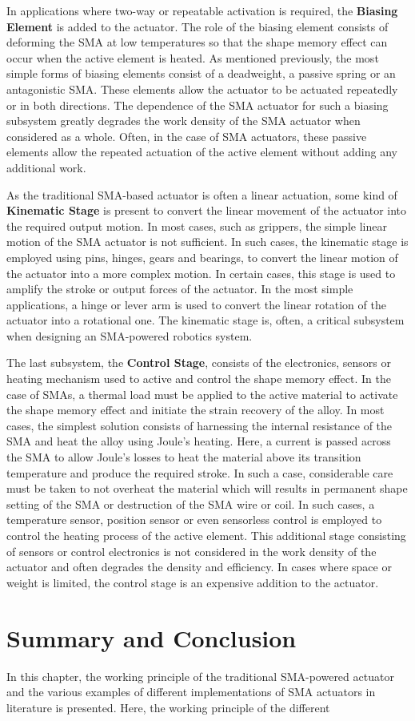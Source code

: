 In applications where two-way or repeatable activation is required, the \textbf{Biasing Element} is added to the actuator. The role of the biasing element consists of deforming the SMA at low temperatures so that the shape memory effect can occur when the active element is heated. As mentioned previously, the most simple forms of biasing elements consist of a deadweight, a passive spring or an antagonistic SMA. These elements allow the actuator to be actuated repeatedly or in both directions. The dependence of the SMA actuator for such a biasing subsystem greatly degrades the work density of the SMA actuator when considered as a whole. Often, in the case of SMA actuators, these passive elements allow the repeated actuation of the active element without adding any additional work.

As the traditional SMA-based actuator is often a linear actuation, some kind of \textbf{Kinematic Stage} is present to convert the linear movement of the actuator into the required output motion. In most cases, such as grippers, the simple linear motion of the SMA actuator is not sufficient. In such cases, the kinematic stage is employed using pins, hinges, gears and bearings, to convert the linear motion of the actuator into a more complex motion. In certain cases, this stage is used to amplify the stroke or output forces of the actuator. In the most simple applications, a hinge or lever arm is used to convert the linear rotation of the actuator into a rotational one. The kinematic stage is, often, a critical subsystem when designing an SMA-powered robotics system.

The last subsystem, the \textbf{Control Stage}, consists of the electronics, sensors or heating mechanism used to active and control the shape memory effect. In the case of SMAs, a thermal load must be applied to the active material to activate the shape memory effect and initiate the strain recovery of the alloy. In most cases, the simplest solution consists of harnessing the internal resistance of the SMA and heat the alloy using Joule's heating. Here, a current is passed across the SMA to allow Joule's losses to heat the material above its transition temperature and produce the required stroke. In such a case, considerable care must be taken to not overheat the material which will results in permanent shape setting of the SMA or destruction of the SMA wire or coil. In such cases, a temperature sensor, position sensor or even sensorless control is employed to control the heating process of the active element. This additional stage consisting of sensors or control electronics is not considered in the work density of the actuator and often degrades the density and efficiency. In cases where space or weight is limited, the control stage is an expensive addition to the actuator.
\section{Summary and Conclusion}
In this chapter, the working principle of the traditional SMA-powered actuator and the various examples of different implementations of SMA actuators in literature is presented. Here, the working principle of the different
